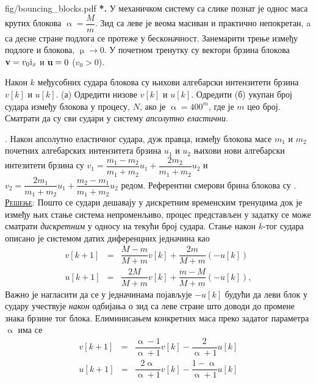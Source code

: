 \newpage
\begin{slikaDesno}{fig/bouncing_blocks.pdf}
\textbf{{\color{red}*}\ID.}
    У механичком систему са слике познат
је однос 
маса крутих блокова $
\upalpha = \dfrac{M}{m}$. 
Зид са леве је веома масиван и 
практично непокретан, a са десне стране подлога 
се протеже у бесконачност.
Занемарити трење између подлоге 
и блокова, 
$\upmu \to 0$. 
У почетном тренутку су вектори брзина 
блокова
${\bf v} = v_0 {\rm i}_x$ и
${\bf u} = 0$ ($v_0 > 0$). 
\end{slikaDesno}
Након $k$ међусобних судара блокова су 
њихови алгебарски интензитети брзина 
$v[k]$ и $u[k]$.
(а) Одредити низове $v[k]$ и $u[k]$.
Одредити (б) укупан
број судара између блокова у процесу, $N$, 
ако је $\upalpha = 400^m$, где је $m$ цео број.
Сматрати да су сви судари у систему 
\textit{апсолутно еластични}. 

\textit{}. Након 
апсолутно еластичног
судара, дуж правца, између блокова масе $m_1$ и $m_2$ 
почетних алгебарских интензитета брзина $u_1$ и 
$u_2$ њихови нови алгебарски интезитети брзина су 
$v_1 = \dfrac{m_1-m_2}{m_1+m_2} u_1 + 
\dfrac{2m_2}{m_1+m_2} u_2$  и 
$v_2 = 
\dfrac{2 m_1}{m_1+m_2} u_1
+
\dfrac{m_2 - m_1}{m_1 + m_2} u_2  
$ редом. Референтни смерови брина блокова 
су . \\

\textsc{\underline{Решење}}: Пошто се судари дешавају у дискретним временским тренуцима 
док је између њих стање система непроменљиво, процес представљен у задатку се може сматрати
\textit{дискретним} у односу на текући број судара. Стање након $k$-тог судара описано је
системом датих диференцних једначина као 
\begin{eqnarray}
    v[k+1] & = & \dfrac{M - m}{M + m} v[k] + \dfrac{2m}{M + m} (-u[k]) \\[2mm]
    u[k+1] & = & \dfrac{2M}{M + m} v[k] + \dfrac{m - M}{M + m} (-u[k]),
\end{eqnarray} 
Важно је нагласити да се у једначинама појављује $-u[k]$ будући да леви блок у судару учествује 
\textit{након} одбијања о зид са леве стране што доводи до промене знака брзине тог блока. 
Елиминисањем конкретних маса преко задатог параметра $\upalpha$ има се
\begin{eqnarray}
    v[k+1] & = & \dfrac{\upalpha - 1}{\upalpha + 1} v[k] - \dfrac{2}{\upalpha + 1} u[k] \\[2mm]
    u[k+1] & = & \dfrac{2\upalpha}{\upalpha + 1} v[k] - \dfrac{1 - \upalpha}{\upalpha + 1} u[k]
\end{eqnarray} 

